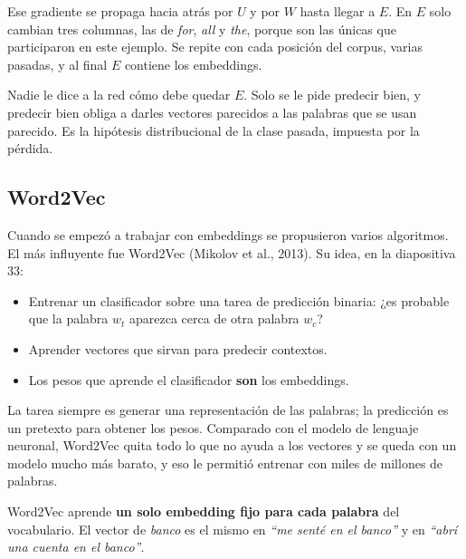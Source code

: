\documentclass[11pt,letterpaper]{article}
\begin{document}
Ese gradiente se propaga hacia atrás por $U$ y por $W$ hasta llegar a
$E$. En $E$ solo cambian tres columnas, las de \textit{for},
\textit{all} y \textit{the}, porque son las únicas que participaron en
este ejemplo. Se repite con cada posición del corpus, varias pasadas,
y al final $E$ contiene los embeddings.

\begin{ojo}
    Nadie le dice a la red cómo debe quedar $E$. Solo se le pide
    predecir bien, y predecir bien obliga a darles vectores parecidos
    a las palabras que se usan parecido. Es la hipótesis distribucional
    de la clase pasada, impuesta por la pérdida.
\end{ojo}


\subsection*{Word2Vec}

Cuando se empezó a trabajar con embeddings se propusieron varios
algoritmos. El más influyente fue Word2Vec (Mikolov et al., 2013). Su
idea, en la diapositiva $33$:

\begin{itemize}[itemsep=0.3em]
    \item Entrenar un clasificador sobre una tarea de predicción
          binaria: ¿es probable que la palabra $w_t$ aparezca cerca de
          otra palabra $w_c$?
    \item Aprender vectores que sirvan para predecir contextos.
    \item Los pesos que aprende el clasificador \textbf{son} los
          embeddings.
\end{itemize}

La tarea siempre es generar una representación de las palabras; la
predicción es un pretexto para obtener los pesos. Comparado con el
modelo de lenguaje neuronal, Word2Vec quita todo lo que no ayuda a los
vectores y se queda con un modelo mucho más barato, y eso le permitió
entrenar con miles de millones de palabras.

\begin{definicion}
    Word2Vec aprende \textbf{un solo embedding fijo para cada palabra}
    del vocabulario. El vector de \textit{banco} es el mismo en
    \textit{``me senté en el banco''} y en \textit{``abrí una cuenta
    en el banco''}.
\end{definicion}
\end{document}
